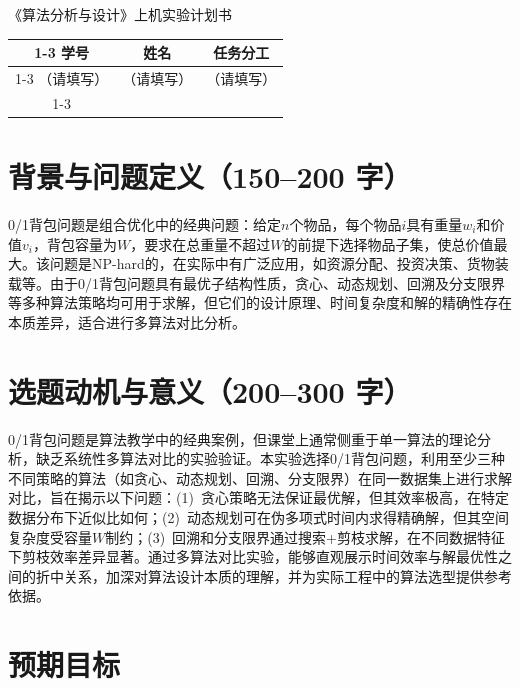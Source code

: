 \documentclass[6pt,a4paper]{ctexart}
\begin{document}
\fontsize{9pt}{10pt}\selectfont


\vspace*{1.3cm}

\begin{center}
  {\Large 《算法分析与设计》上机实验计划书}
\end{center}

\vspace{1.3cm}

\begin{center}
\begin{tabular}{ccc}
\cline{1-3}
学号 & 姓名 & 任务分工 \\
\cline{1-3}
（请填写） & （请填写） & （请填写） \\
\cline{1-3}
\end{tabular}
\end{center}

\section{背景与问题定义（150--200 字）}

0/1背包问题是组合优化中的经典问题：给定$n$个物品，每个物品$i$具有重量$w_i$和价值$v_i$，背包容量为$W$，要求在总重量不超过$W$的前提下选择物品子集，使总价值最大。该问题是NP-hard的，在实际中有广泛应用，如资源分配、投资决策、货物装载等。由于0/1背包问题具有最优子结构性质，贪心、动态规划、回溯及分支限界等多种算法策略均可用于求解，但它们的设计原理、时间复杂度和解的精确性存在本质差异，适合进行多算法对比分析。

\section{选题动机与意义（200--300 字）}

0/1背包问题是算法教学中的经典案例，但课堂上通常侧重于单一算法的理论分析，缺乏系统性多算法对比的实验验证。本实验选择0/1背包问题，利用至少三种不同策略的算法（如贪心、动态规划、回溯、分支限界）在同一数据集上进行求解对比，旨在揭示以下问题：(1)~贪心策略无法保证最优解，但其效率极高，在特定数据分布下近似比如何；(2)~动态规划可在伪多项式时间内求得精确解，但其空间复杂度受容量$W$制约；(3)~回溯和分支限界通过搜索+剪枝求解，在不同数据特征下剪枝效率差异显著。通过多算法对比实验，能够直观展示时间效率与解最优性之间的折中关系，加深对算法设计本质的理解，并为实际工程中的算法选型提供参考依据。

\section{预期目标}
\end{document}
